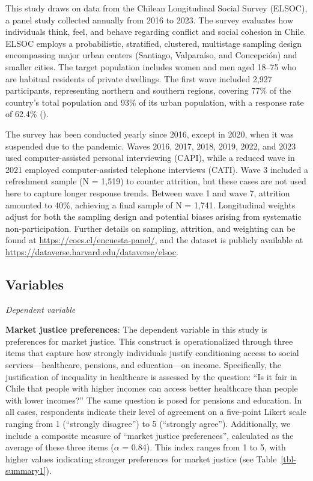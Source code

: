 \documentclass[
  12pt,
]{article}
\begin{document}
This study draws on data from the Chilean Longitudinal Social Survey
(ELSOC), a panel study collected annually from 2016 to 2023. The survey
evaluates how individuals think, feel, and behave regarding conflict and
social cohesion in Chile. ELSOC employs a probabilistic, stratified,
clustered, multistage sampling design encompassing major urban centers
(Santiago, Valparaíso, and Concepción) and smaller cities. The target
population includes women and men aged 18--75 who are habitual residents
of private dwellings. The first wave included 2,927 participants,
representing northern and southern regions, covering 77\% of the
country's total population and 93\% of its urban population, with a
response rate of 62.4\% ().

The survey has been conducted yearly since 2016, except in 2020, when it
was suspended due to the pandemic. Waves 2016, 2017, 2018, 2019, 2022,
and 2023 used computer-assisted personal interviewing (CAPI), while a
reduced wave in 2021 employed computer-assisted telephone interviews
(CATI). Wave 3 included a refreshment sample (N = 1,519) to counter
attrition, but these cases are not used here to capture longer response
trends. Between wave 1 and wave 7, attrition amounted to 40\%, achieving
a final sample of N = 1,741. Longitudinal weights adjust for both the
sampling design and potential biases arising from systematic
non-participation. Further details on sampling, attrition, and weighting
can be found at \url{https://coes.cl/encuesta-panel/}, and the dataset
is publicly available at
\url{https://dataverse.harvard.edu/dataverse/elsoc}.

\subsection{Variables}\label{variables}

\emph{Dependent variable}

\textbf{Market justice preferences}: The dependent variable in this
study is preferences for market justice. This construct is
operationalized through three items that capture how strongly
individuals justify conditioning access to social services---healthcare,
pensions, and education---on income. Specifically, the justification of
inequality in healthcare is assessed by the question: ``Is it fair in
Chile that people with higher incomes can access better healthcare than
people with lower incomes?'' The same question is posed for pensions and
education. In all cases, respondents indicate their level of agreement
on a five-point Likert scale ranging from 1 (``strongly disagree'') to 5
(``strongly agree''). Additionally, we include a composite measure of
``market justice preferences'', calculated as the average of these three
items (\(\alpha\) = 0.84). This index ranges from 1 to 5, with higher
values indicating stronger preferences for market justice (see
Table~\ref{tbl-summary1}).
\end{document}
